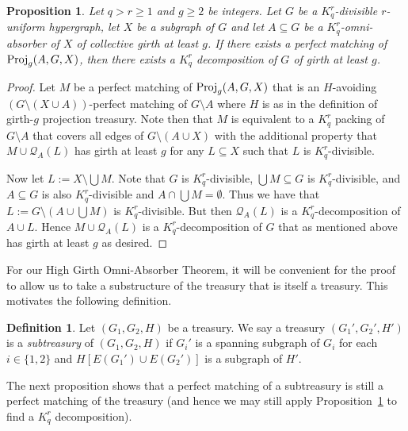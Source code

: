 \documentclass[11pt]{article}
\newcounter{i}
\theoremstyle{plain}
\newtheorem{proposition}[thm]{Proposition}
\theoremstyle{plain} %
\theoremstyle{definition}
\newtheorem{definition}[thm]{Definition}
\begin{document}
\begin{proposition}\label{prop:FindSteiner}
Let $q>r\ge 1$ and $g\ge 2$ be integers. Let $G$ be a $K_q^r$-divisible $r$-uniform hypergraph, let $X$ be a subgraph of $G$ and let $A\subseteq G$ be a $K_q^r$-omni-absorber of $X$ of collective girth at least $g$. If there exists a perfect matching of ${\rm Proj}_g(A,G,X)$, then there exists a $K_q^r$ decomposition of $G$ of girth at least $g$.
\end{proposition}
\begin{proof}
Let $M$ be a perfect matching of ${\rm Proj}_g(A,G,X)$ that is an $H$-avoiding $(G\setminus (X\cup A))$-perfect matching of $G\setminus A$ where $H$ is as in the definition of girth-$g$ projection treasury. Note then that $M$ is equivalent to a $K_q^r$ packing of $G\setminus A$ that covers all edges of $G\setminus (A\cup X)$ with the additional property that $M\cup \mathcal{Q}_A(L)$ has girth at least $g$ for any $L\subseteq X$ such that $L$ is $K_q^r$-divisible. 

Now let $L := X\setminus \bigcup M$. Note that $G$ is $K_q^r$-divisible, $\bigcup M \subseteq G$ is $K_q^r$-divisible, and $A\subseteq G$ is also $K_q^r$-divisible and $A\cap \bigcup M = \emptyset$. Thus we have that $L:= G\setminus (A\cup \bigcup M)$ is $K_q^r$-divisible. But then $\mathcal{Q}_A(L)$ is a $K_q^r$-decomposition of $A\cup L$. Hence $M\cup \mathcal{Q}_A(L)$ is a $K_q^r$-decomposition of $G$ that as mentioned above has girth at least $g$ as desired.
\end{proof}

For our High Girth Omni-Absorber Theorem, it will be convenient for the proof to allow us to take a substructure of the treasury that is itself a treasury. This motivates the following definition.

\begin{definition}
Let $(G_1,G_2,H)$ be a treasury. We say a treasury $(G_1',G_2',H')$ is a \emph{subtreasury} of $(G_1,G_2,H)$ if $G_i'$ is a spanning subgraph of $G_i$ for each $i\in \{1,2\}$ and $H[E(G_1')\cup E(G_2')]$ is a subgraph of $H'$. 
\end{definition}

The next proposition shows that a perfect matching of a subtreasury is still a perfect matching of the treasury (and hence we may still apply Proposition~\ref{prop:FindSteiner} to find a $K_q^r$ decomposition).
\end{document}
